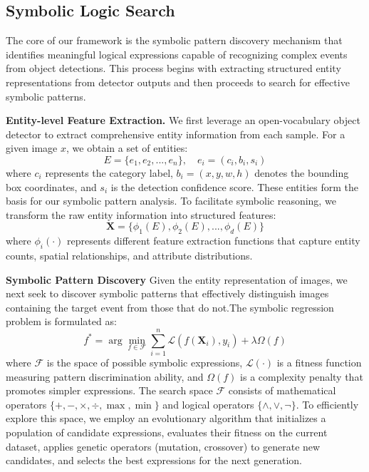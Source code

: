 \subsection{Symbolic Logic Search}
The core of our framework is the symbolic pattern discovery mechanism that identifies meaningful logical expressions capable of recognizing complex events from object detections. This process begins with extracting structured entity representations from detector outputs and then proceeds to search for effective symbolic patterns. \par
% 
\noindent\textbf{Entity-level Feature Extraction.} We first leverage an open-vocabulary object detector to extract comprehensive entity information from each sample. For a given image $x$, we obtain a set of entities:
\begin{equation}
    E = \{e_1, e_2, ..., e_n\}, \quad e_i = (c_i, b_i, s_i)
\end{equation}
where $c_i$ represents the category label, $b_i = (x, y, w, h)$ denotes the bounding box coordinates, and $s_i$ is the detection confidence score. These entities form the basis for our symbolic pattern analysis.
To facilitate symbolic reasoning, we transform the raw entity information into structured features:
\begin{equation}
    \mathbf{X} = \{\phi_1(E), \phi_2(E), ..., \phi_d(E)\}
\end{equation}
where $\phi_i(\cdot)$ represents different feature extraction functions that capture entity counts, spatial relationships, and attribute distributions. \par
% 
\noindent\textbf{Symbolic Pattern Discovery}
Given the entity representation of images, we next seek to discover symbolic patterns that effectively distinguish images containing the target event from those that do not.The symbolic regression problem is formulated as:
\begin{equation}
    f^* = \arg\min_{f \in \mathcal{F}} \sum_{i=1}^{n} \mathcal{L}(f(\mathbf{X}_i), y_i) + \lambda \Omega(f)
\end{equation}
where $\mathcal{F}$ is the space of possible symbolic expressions, $\mathcal{L}(\cdot)$ is a fitness function measuring pattern discrimination ability, and $\Omega(f)$ is a complexity penalty that promotes simpler expressions.
The search space $\mathcal{F}$ consists of mathematical operators 
$\{+, -, \times, \div, \max, \min\}$ 
and logical operators $\{\land, \lor, \neg\}$. 
To efficiently explore this space, we employ an evolutionary algorithm that initializes a population of candidate expressions, evaluates their fitness on the current dataset, applies genetic operators (mutation, crossover) to generate new candidates, and selects the best expressions for the next generation.
